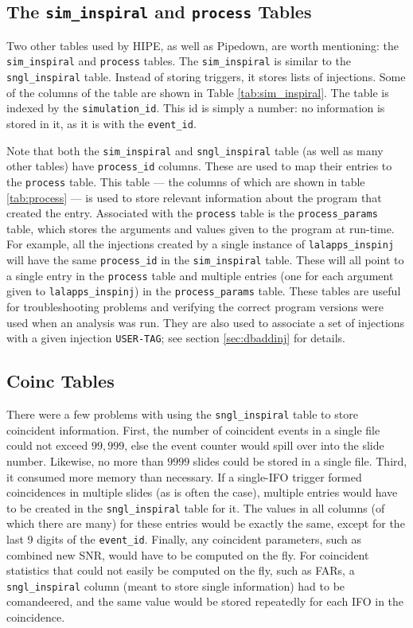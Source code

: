 \subsection{The \texttt{sim\_inspiral} and \texttt{process} Tables}

Two other tables used by \ac{HIPE}, as well as Pipedown, are worth mentioning: the \texttt{sim\_inspiral} and \texttt{process} tables. The \texttt{sim\_inspiral} is similar to the \texttt{sngl\_inspiral} table. Instead of storing triggers, it stores lists of injections. Some of the columns of the table are shown in Table \ref{tab:sim_inspiral}. The table is indexed by the \texttt{simulation\_id}. This id is simply a number: no information is stored in it, as it is with the \texttt{event\_id}.

Note that both the \texttt{sim\_inspiral} and \texttt{sngl\_inspiral} table (as well as many other tables) have \texttt{process\_id} columns. These are used to map their entries to the \texttt{process} table. This table --- the columns of which are shown in table \ref{tab:process} --- is used to store relevant information about the program that created the entry. Associated with the \texttt{process} table is the \texttt{process\_params} table, which stores the arguments and values given to the program at run-time. For example, all the injections created by a single instance of \texttt{lalapps\_inspinj} will have the same \texttt{process\_id} in the \texttt{sim\_inspiral} table. These will all point to a single entry in the \texttt{process} table and multiple entries (one for each argument given to \texttt{lalapps\_inspinj}) in the \texttt{process\_params} table. These tables are useful for troubleshooting problems and verifying the correct program versions were used when an analysis was run. They are also used to associate a set of injections with a given injection \texttt{USER-TAG}; see section \ref{sec:dbaddinj} for details.

\subsection{Coinc Tables}

There were a few problems with using the \texttt{sngl\_inspiral} table to store coincident information. First, the number of coincident events in a single file could not exceed $99,999$, else the event counter would spill over into the slide number. Likewise, no more than $9999$ slides could be stored in a single file. Third, it consumed more memory than necessary. If a single-\ac{IFO} trigger formed coincidences in multiple slides (as is often the case), multiple entries would have to be created in the \texttt{sngl\_inspiral} table for it. The values in all columns (of which there are many) for these entries would be exactly the same, except for the last 9 digits of the \texttt{event\_id}. Finally, any coincident parameters, such as combined new \ac{SNR}, would have to be computed on the fly. For coincident statistics that could not easily be computed on the fly, such as \acp{FAR}, a \texttt{sngl\_inspiral} column (meant to store single information) had to be comandeered, and the same value would be stored repeatedly for each \ac{IFO} in the coincidence.

